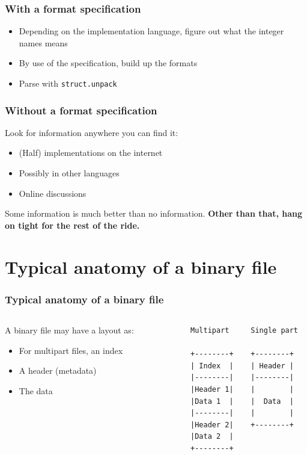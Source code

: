 \documentclass{beamer}
\begin{document}
\begin{frame}[fragile]
  \frametitle{With a format specification}
  \begin{itemize}
  \item Depending on the implementation language, figure out what the integer names means
  \item By use of the specification, build up the formats
  \item Parse with \texttt{struct.unpack}
  \end{itemize}
\end{frame}

\begin{frame}
  \frametitle{Without a format specification}
  Look for information anywhere you can find it:
  \begin{itemize}
  \item (Half) implementations on the internet
  \item Possibly in other languages
  \item Online discussions
  \end{itemize}
  Some information is much better than no information.\newline
  \newline
  \textbf{Other than that, hang on tight for the rest of the ride.}
\end{frame}

\section{Typical anatomy of a binary file}
\begin{frame}[fragile]
  \frametitle{Typical anatomy of a binary file}
  \begin{columns}[onlytextwidth]
    \begin{column}{0.4\textwidth}
      A binary file may have a layout as:
      \begin{itemize}
      \item For multipart files, an index
      \item A header (metadata)
      \item The data
      \end{itemize}
    \end{column}
    \begin{column}{0.6\textwidth}
      \begin{verbatim}
        Multipart     Single part

        +--------+    +--------+
        | Index  |    | Header |
        |--------|    |--------|
        |Header 1|    |        |
        |Data 1  |    |  Data  |
        |--------|    |        |
        |Header 2|    +--------+
        |Data 2  |
        +--------+
      \end{verbatim}
    \end{column}
  \end{columns}
\end{frame}
\end{document}
